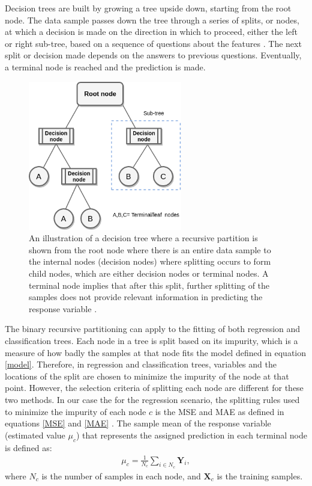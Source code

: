 Decision trees are built by growing a tree upside down, starting from the root node. The data sample passes down the tree through a series of splits, or nodes, at which a decision is made on the direction in which to proceed, either the left or right sub-tree, based on a sequence of questions about the features \citep{musicant2007supervised}. The next split or decision made depends on the answers to previous questions. Eventually, a terminal node is reached and the prediction is made.  

 \begin{figure}[H]
  \centering
    \includegraphics[width=0.6\textwidth]{images/DC.png}
    \caption{An illustration of a decision tree where a recursive partition is shown from the root node where there is an entire data sample to the internal nodes (decision nodes) where splitting occurs to form child nodes, which are either decision nodes or terminal nodes. A terminal node implies that after this split, further splitting of the samples does not provide relevant information in predicting the response variable \citep{moisen2008classification}. }
  \label{images/DecisionTree}
\end{figure}

The binary recursive partitioning can apply to the fitting of both regression and classification trees. Each node in a tree is split based on its impurity, which is a measure of how badly the samples at that node fits the model defined in equation \ref{model}. Therefore, in regression and classification trees, variables and the locations of the split are
chosen to minimize the impurity of the node at that point. However, the selection criteria of splitting each node are different for these two methods. In our case the for the regression scenario, the splitting rules used to minimize the impurity of each node $c$ is the MSE and MAE as defined in equations \ref{MSE} and \ref{MAE} \citep{morgan2014classification}. The sample mean of the response variable (estimated value $\mu_{c}$) that represents the assigned prediction in each terminal node is defined as: 
\begin{align}
\mu_{c}=\frac{1}{N_{c}} \sum_{i\in N_{c}} \textbf{Y}_{i},
\label{model}
\end{align} 
where $N_{c}$ is the number of samples in each node, and $\textbf{X}_{c}$ is the training samples. 
 
